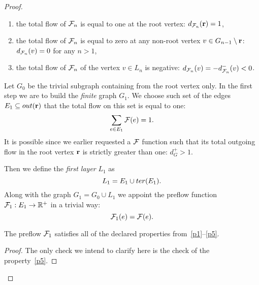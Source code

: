 \documentclass[12pt]{article}
\begin{document}
\begin{proof}
\begin{enumerate}[label=\textbf{P\arabic*}]
          \item \label{p3} the total flow of $\mathcal{F}_{n}$ is equal to one at the root vertex: $d_{\mathcal{F}_{n}}(\mathbf{r}) = 1$,
          \item \label{p4} the total flow of $\mathcal{F}_{n}$ is equal to zero at any non-root vertex $v \in G_{n-1}\setminus \mathbf{r}$: $d_{\mathcal{F}_{n}}(v) = 0$ for any $n > 1$,
          \item \label{p5} the total flow of $\mathcal{F}_{n}$ of the vertex $v \in L_n$ is negative: $d_{\mathcal{F}_{n}}(v) = -d^{-}_{\mathcal{F}_{n}}(v) < 0$.
        \end{enumerate}
      Let $G_0$ be the trivial subgraph containing from the root vertex only.
      In the first step we are to build the \emph{finite} graph $G_1$.
      We choose such set of the edges $E_1 \subseteq out(\mathbf{r})$ that the total flow on this set is equal to one:
      \[
        \sum_{e \in E_1} \mathcal{F}(e) = 1.
      \]
      It is possible since we earlier requested a $\mathcal{F}$ function such that its total outgoing flow in the root vertex
        $\mathbf{r}$ is strictly greater than one: $d^{+}_{G} > 1$.

      Then we define the \emph{first layer} $L_1$ as
      \[
        L_1 = E_1 \cup ter(E_1).
      \]
      Along with the graph $G_1 = G_0 \cup L_1$ we appoint the preflow function $\mathcal{F}_{1}: E_1 \to \mathbb{R}^{+}$ in a trivial way:
      \[
        \mathcal{F}_{1}(e) = \mathcal{F}(e).
      \]
      \begin{prop}
        The preflow $\mathcal{F}_{1}$ satisfies all of the declared properties from~\ref{p1}--\ref{p5}.
      \end{prop}
      \begin{proof}
        The only check we intend to clarify here is the check of the property~\ref{p5}.


\end{proof}
\end{proof}
\end{document}
